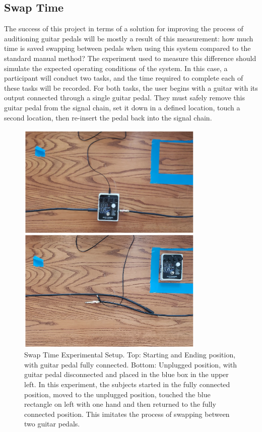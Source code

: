 \documentclass{article}
\begin{document}
	\subsection{Swap Time}
	The success of this project in terms of a solution for improving the process of auditioning guitar pedals will be mostly a result of this measurement: how much time is saved swapping between pedals when using this system compared to the standard manual method?  The experiment used to measure this difference should simulate the expected operating conditions of the system.  In this case, a participant will conduct two tasks, and the time required to complete each of these tasks will be recorded.  For both tasks, the user begins with a guitar with its output connected through a single guitar pedal.  They must safely remove this guitar pedal from the signal chain, set it down in a defined location, touch a second location, then re-insert the pedal back into the signal chain.

	\begin{figure}
		\centering
		\includegraphics[width = 0.8\textwidth]{PR5Images/SwapTimeSetup.png}
		\caption{Swap Time Experimental Setup.  Top: Starting and Ending position, with guitar pedal fully connected.  Bottom: Unplugged position, with guitar pedal disconnected and placed in the blue box in the upper left.  In this experiment, the subjects started in the fully connected position, moved to the unplugged position, touched the blue rectangle on left with one hand and then returned to the fully connected position.  This imitates the process of swapping between two guitar pedals.}
		\label{fig:SwapTimeExperimentalSetup}
	\end{figure}
\end{document}
